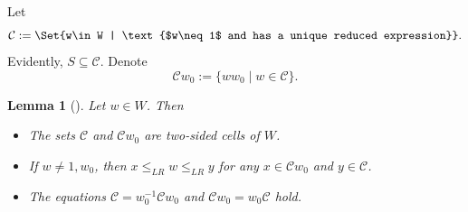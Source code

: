 \documentclass[11pt, reqno]{amsart}
\def\cC{\mathcal{C}}
\newcommand{\caC}{\mathcal{C}}
\newcommand{\aff}{\mathbf{a}}
\renewcommand{\subset}{\subseteq}
\newcommand{\rar}{\rightarrow}
\newtheorem{lem}[Thm]{Lemma}
\theoremstyle{definition}
\numberwithin{equation}{section}
\begin{document}


Let 
\[
\cC := \Set{w\in W | \text{$w\neq 1$ and has a unique   reduced expression}}.
\]
Evidently, $S\subset\caC$.
Denote \[
\mathcal{C}w_0:=\{ww_0\mid w\in\mathcal{C}\}. 
\]

\begin{lem}[{\cite[Lem. 3.3]{BMXX}}]\label{hklem2}
Let $w\in W$. Then
	\begin{itemize}
 \item[(1)]  The sets $\mathcal{C}$ and $\mathcal{C}w_0$ are two-sided cells of $W$.
		\item[(2)]  If $w\neq 1, w_0$, then $x\leq_{LR} w\leq_{LR} y$ for any $x\in\mathcal{C}w_0$ and $y\in\mathcal{C}$.
            \item[(3)] The equations $\cC = w_0^{-1} \cC w_0$ and $\cC w_0 = w_0\cC$ hold.
	\end{itemize}
 
 
\end{lem}








\end{document}
